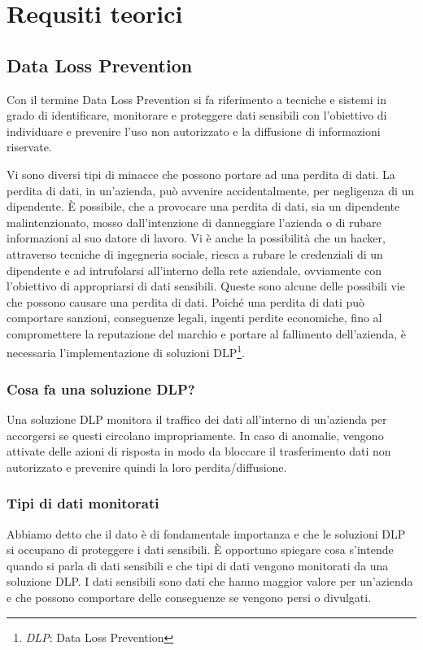 \chapter{Requsiti teorici}

\section{Data Loss Prevention}
Con il termine Data Loss Prevention si fa riferimento a 
tecniche e sistemi in grado di identificare, monitorare 
e proteggere dati sensibili con l’obiettivo di individuare 
e prevenire l’uso non autorizzato e la diffusione di informazioni riservate. 

Vi sono diversi tipi di minacce che possono portare ad una perdita di dati.
La perdita di dati, in un'azienda, può avvenire accidentalmente, per negligenza di un 
dipendente. È possibile, che a provocare una perdita di dati, sia un dipendente malintenzionato,
mosso dall'intenzione di danneggiare l'azienda o di rubare informazioni al suo datore di lavoro.
Vi è anche la possibilità che un hacker, attraverso tecniche di ingegneria sociale, riesca a rubare
le credenziali di un dipendente e ad intrufolarsi all'interno della rete aziendale, ovviamente con 
l'obiettivo di appropriarsi di dati sensibili.
Queste sono alcune delle possibili vie che possono causare una perdita di dati. Poiché una perdita di dati
può comportare sanzioni, conseguenze legali, ingenti perdite economiche, fino al compromettere la reputazione del 
marchio e portare al fallimento dell'azienda, è necessaria l'implementazione di soluzioni
DLP\footnote{\textit{DLP}: Data Loss Prevention}.
 

\subsection{Cosa fa una soluzione DLP?}
    Una soluzione DLP monitora il traffico dei dati all'interno di un'azienda per accorgersi se
    questi circolano impropriamente. In caso di anomalie, vengono attivate delle azioni di risposta 
    in modo da bloccare il trasferimento dati non autorizzato e prevenire quindi la loro perdita/diffusione.
    \cite{OpenLab}


\subsection{Tipi di dati monitorati}
    Abbiamo detto che il dato è di fondamentale importanza e che le soluzioni DLP si occupano di proteggere i dati sensibili.
    È opportuno spiegare cosa s'intende quando si parla di dati sensibili e che tipi di dati vengono monitorati 
    da una soluzione DLP. I dati sensibili sono dati che hanno maggior valore per un'azienda e che possono comportare 
    delle conseguenze se vengono persi o divulgati.

